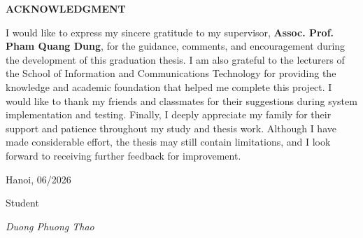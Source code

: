 \begin{center}\textbf{\large ACKNOWLEDGMENT}\end{center}


\noindent
I would like to express my sincere gratitude to my supervisor,
\textbf{Assoc. Prof. Pham Quang Dung}, for the guidance, comments, and encouragement during
the development of this graduation thesis. I am also grateful to the lecturers
of the School of Information and Communications Technology for providing the
knowledge and academic foundation that helped me complete this project. I would
like to thank my friends and classmates for their suggestions during system
implementation and testing. Finally, I deeply appreciate my family for their
support and patience throughout my study and thesis work. Although I have made
considerable effort, the thesis may still contain limitations, and I look
forward to receiving further feedback for improvement.

\vspace{1cm}
\noindent Hanoi, 06/2026

\hfill Student

\hfill \textit{Duong Phuong Thao}
